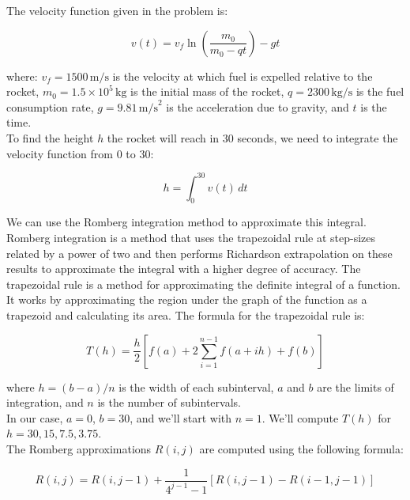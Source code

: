\documentclass[12pt, a4paper]{article}
\numberwithin{equation}{section}
\begin{document}
The velocity function given in the problem is:

\begin{equation}
v(t) = v_f \ln\left(\frac{m_0}{m_0 - qt}\right) - gt
\end{equation}

where:
\(v_f = 1500 \, \text{m/s}\) is the velocity at which fuel is expelled relative to the rocket,
\(m_0 = 1.5 \times 10^5 \, \text{kg}\) is the initial mass of the rocket,
\(q = 2300 \, \text{kg/s}\) is the fuel consumption rate,
\(g = 9.81 \, \text{m/s}^2\) is the acceleration due to gravity, and
\(t\) is the time.\\

To find the height \(h\) the rocket will reach in 30 seconds, we need to integrate the velocity function from 0 to 30:

\begin{equation}
h = \int_{0}^{30} v(t) \, dt
\end{equation}

We can use the Romberg integration method to approximate this integral. Romberg integration is a method that uses the trapezoidal rule at step-sizes related by a power of two and then performs Richardson extrapolation on these results to approximate the integral with a higher degree of accuracy. The trapezoidal rule is a method for approximating the definite integral of a function. It works by approximating the region under the graph of the function as a trapezoid and calculating its area. The formula for the trapezoidal rule is:

\begin{equation}
T(h) = \frac{h}{2} \left[f(a) + 2\sum_{i=1}^{n-1} f(a+ih) + f(b)\right]    
\end{equation}


where \(h = (b-a)/n\) is the width of each subinterval, \(a\) and \(b\) are the limits of integration, and \(n\) is the number of subintervals.\\

In our case, \(a = 0\), \(b = 30\), and we'll start with \(n = 1\). We'll compute \(T(h)\) for \(h = 30, 15, 7.5, 3.75\).\\

The Romberg approximations \(R(i, j)\) are computed using the following formula:

\begin{equation}
R(i, j) = R(i, j-1) + \frac{1}{4^{j-1}-1} \left[R(i, j-1) - R(i-1, j-1)\right]    
\end{equation}
\end{document}

